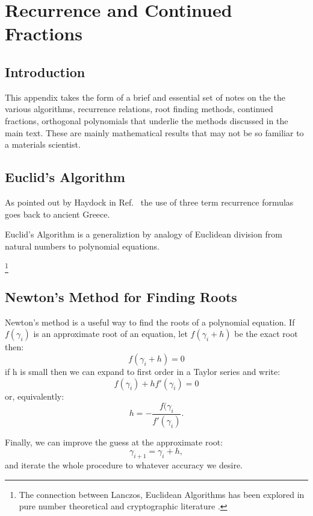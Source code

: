 \chapter{Recurrence and Continued Fractions}
\section{Introduction}
This appendix takes the form of a brief and essential
set of notes on the the various algorithms, recurrence relations,
root finding methods, continued fractions, orthogonal polynomials that 
underlie the methods discussed in the main text. 
These are mainly mathematical results
that may not be so familiar to a materials scientist.

\section{Euclid's Algorithm}
As pointed out by Haydock in Ref.~\cite{weaire85} the 
use of three term recurrence formulas goes back to 
ancient Greece. 

Euclid's Algorithm is a generaliztion 
by analogy of Euclidean division from natural numbers
to polynomial equations.

\footnote{The connection between Lanczos,
Euclidean Algorithms has been explored in pure number 
theoretical and cryptographic literature \cite{compmath97}.}

\section{Newton's Method for Finding Roots}
Newton's method is a useful way to find the roots of a polynomial
equation. If $f(\gamma_i)$ is an approximate root of an equation,
let $f(\gamma_i+h)$ be the exact root then:
%
\begin{equation}
f(\gamma_i+h)=0
\end{equation}
%
if h is small then we can expand to first order in a 
Taylor series and write:
\begin{equation}
f(\gamma_i) + h f'(\gamma_{i})= 0
\end{equation}
%
or, equivalently:
%
\begin{equation}
h = -\frac{f(\gamma_{i}}{f'(\gamma_i)}.
\end{equation}

Finally, we can improve the guess at the approximate root:
%
\begin{equation}
\gamma_{i+1} =  \gamma_{i} + h,
\end{equation}
%
and iterate the whole procedure to whatever accuracy we desire.

